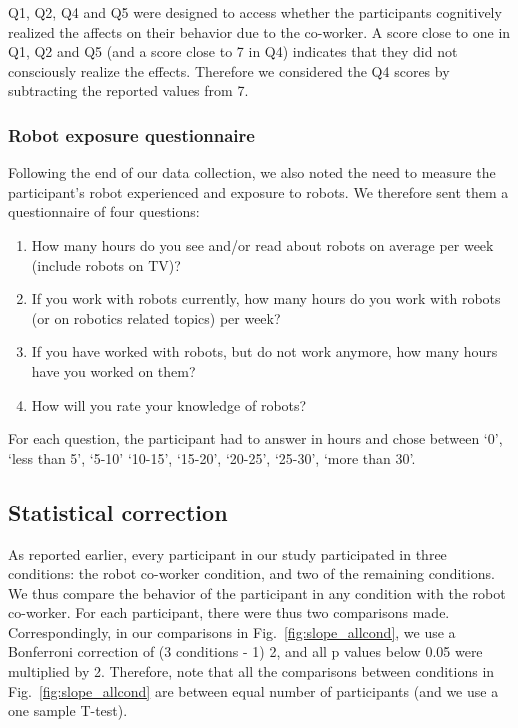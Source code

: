 \documentclass[a4paper, 12pt, oneside]{Thesis}  %
\begin{document}
Q1, Q2, Q4 and Q5 were designed to access whether the participants cognitively realized the affects on their behavior due to the co-worker. A score close to one in Q1, Q2 and Q5 (and a score close to 7 in Q4) indicates that they did not consciously realize the effects. Therefore we considered the Q4 scores by subtracting the reported values from 7.

\subsubsection{Robot exposure questionnaire}

Following the end of our data collection, we also noted the need to measure the participant's robot experienced and exposure to robots. We therefore sent them a questionnaire of four questions:

\begin{enumerate}[start=1,label={RQ\arabic*.}]
	\item How many hours do you see and/or read about robots on average per week (include robots on TV)?
	\item If you work with robots currently, how many hours do you work with robots (or on robotics related topics) per week?
	\item If you have worked with robots, but do not work anymore, how many hours have you worked on them?
	\item How will you rate your knowledge of robots?
\end{enumerate}

For each question, the participant had to answer in hours and chose between `0', `less than 5', `5-10' `10-15', `15-20', `20-25', `25-30', `more than 30'.


\subsection{Statistical correction}

As reported earlier, every participant in our study participated in three conditions: the robot co-worker condition, and two of the remaining conditions. We thus compare the behavior of the participant in any condition with the robot co-worker. For each participant, there were thus two comparisons made. Correspondingly, in our comparisons in Fig.~\ref{fig:slope_allcond}, we use a Bonferroni correction of (3 conditions - 1) 2, and all p values below 0.05 were multiplied by 2. Therefore, note that all the comparisons between conditions in Fig.~\ref{fig:slope_allcond} are between equal number of participants (and we use a one sample T-test).
\end{document}
